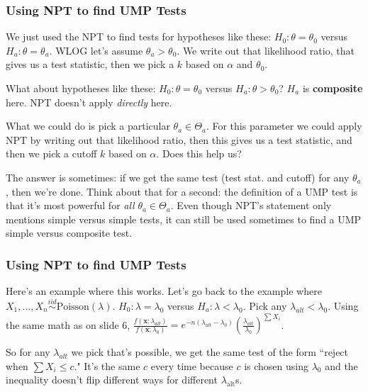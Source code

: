 \documentclass{beamer}
\begin{document}
\begin{frame}
\frametitle{Using NPT to find UMP Tests}

We just used the NPT to find tests for hypotheses like these: $H_0: \theta = \theta_0$ versus $H_a: \theta = \theta_a$. WLOG let's assume $\theta_a > \theta_0$. We write out that likelihood ratio, that gives us a test statistic, then we pick a $k$ based on $\alpha$ and $\theta_0$.
\newline

What about hypotheses like these: $H_0: \theta = \theta_0$ versus $H_a: \theta > \theta_0$? $H_a$ is \textbf{composite} here. NPT doesn't apply \emph{directly} here.
\newline

What we could do is pick a particular $\theta_a \in \Theta_a$. For this parameter we could apply NPT by writing out that likelihood ratio, then this gives us a test statistic, and then we pick a cutoff $k$ based on $\alpha$. Does this help us?
\newline

The answer is sometimes: if we get the same test (test stat. and cutoff) for any $\theta_a$, then we're done. Think about that for a second: the definition of a UMP test is that it's most powerful for \emph{all} $\theta_a \in \Theta_a$. Even though NPT's statement only mentions simple versus simple tests, it can still be used sometimes to find a UMP simple versus composite test. 

\end{frame}

\begin{frame}
\frametitle{Using NPT to find UMP Tests}

Here's an example where this works. Let's go back to the example where $X_1, \ldots, X_n \overset{iid}{\sim} \text{Poisson}(\lambda)$. $H_0: \lambda = \lambda_0$ versus $H_a: \lambda < \lambda_0$. Pick any $\lambda_{alt} < \lambda_0$. Using the same math as on slide 6, $\frac{f(\mathbf{x};\lambda_{alt})}{f(\mathbf{x};\lambda_0) } = e^{-n(\lambda_{alt} - \lambda_0)} \left(\frac{\lambda_{alt}}{\lambda_0}\right)^{\sum X_i}$. 
\newline

So for any $\lambda_{alt}$ we pick that's possible, we get the same test of the form ``reject when $\sum X_i \le c$." It's the same $c$ every time because $c$ is chosen using $\lambda_0$ and the inequality doesn't flip different ways for different $\lambda_{\text{alt}}$s. 
\end{frame}
\end{document}
